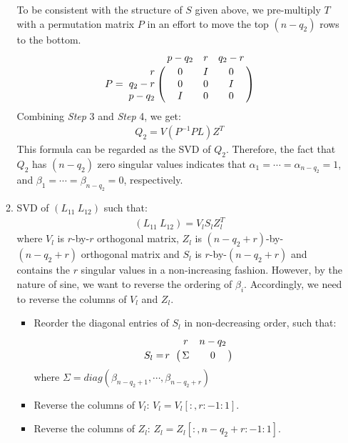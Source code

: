 \begin{enumerate}
\begin{enumerate}
                    To be consistent with the structure of $S$ given above, we pre-multiply $T$ with a permutation matrix $P$ in an effort to move the top $(n-q_2)$ rows to the bottom.
                    \begin{displaymath}
                        P = \bordermatrix{& p-q_2 & r & q_2-r \cr
                            \hfill r & 0 & I & 0 \cr
                            \hfill q_2-r & 0 & 0 & I \cr
                            \hfill p-q_2 & I & 0 & 0}
                    \end{displaymath}
                    Combining \textit{Step} 3 and \textit{Step} 4, we get:
                        \begin{align} \label{eq-q_2-case2}
                            Q_2 = V(P^{-1}PL)Z^{T}
                        \end{align}
                    This formula can be regarded as the SVD of $Q_2$. Therefore, the fact that $Q_2$ has $(n-q_2)$ zero singular values indicates that $\alpha_{1} = \cdots = \alpha_{n-q_2} = 1$, and $\beta_{1} = \cdots = \beta_{n-q_2} = 0$, respectively. 
                \item SVD of $(L_{11} \ L_{12})$ such that:
                    \begin{align} \label{eq-l-svd}
                        (L_{11} \ L_{12}) = V_{l}S_{l}Z_{l}^{T}
                    \end{align}
                    where $V_{l}$ is $r$-by-$r$ orthogonal matrix, $Z_{l}$ is $(n-q_2+r)$-by-$(n-q_2+r)$ orthogonal matrix and $S_{l}$ is $r$-by-$(n-q_2+r)$ and contains the $r$ singular values in a non-increasing fashion. However, by the nature of sine, we want to reverse the ordering of $\beta_i$. Accordingly, we need to reverse the columns of $V_{l}$ and $Z_{l}$.
                        \begin{itemize}
                            \item Reorder the diagonal entries of $S_{l}$ in non-decreasing order, such that:
                            \begin{displaymath}
                                S_{l} = \bordermatrix{ & r & n-q_2\cr
                                    \hfill r & \Sigma & 0}
                            \end{displaymath} where $\Sigma = diag(\beta_{n-q_2+1}, \cdots, \beta_{n-q_2+r})$
                            \item Reverse the columns of $V_l$: $V_l = V_l[:,r:-1:1]$. 
                            \item Reverse the columns of $Z_l$: $Z_l = Z_l[:,n-q_2+r:-1:1]$. 

\end{itemize}
\end{enumerate}
\end{enumerate}
